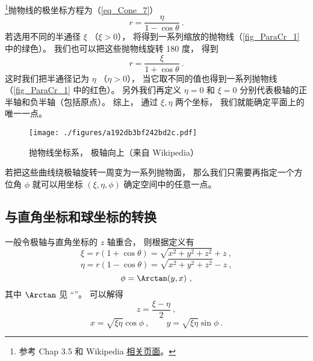 

\footnote{参考 \cite{Bransden} Chap 3.5 和 Wikipedia \href{https://en.wikipedia.org/wiki/Parabolic_coordinates}{相关页面}。}抛物线的极坐标方程为（\autoref{eq_Cone_7}）
\begin{equation}\label{eq_ParaCr_1}
r = \frac{\eta}{1 - \cos \theta }~.
\end{equation}
若选用不同的半通径 $\xi$ （$\xi > 0$）， 将得到一系列缩放的抛物线（\autoref{fig_ParaCr_1} 中的绿色）。 我们也可以把这些抛物线旋转 180 度， 得到
\begin{equation}
r = \frac{\xi}{1 + \cos \theta }~.
\end{equation}
这时我们把半通径记为 $\eta$ （$\eta > 0$）， 当它取不同的值也得到一系列抛物线（\autoref{fig_ParaCr_1} 中的红色）。 另外我们再定义 $\eta = 0$ 和 $\xi = 0$ 分别代表极轴的正半轴和负半轴（包括原点）。 综上， 通过 $\xi, \eta$ 两个坐标， 我们就能确定平面上的唯一一点。

\begin{figure}[ht]
\centering
\texttt{[image: ./figures/a192db3bf242bd2c.pdf]}
\caption{抛物线坐标系， 极轴向上（来自 Wikipedia）} \label{fig_ParaCr_1}
\end{figure}

若把这些曲线绕极轴旋转一周变为一系列抛物面， 那么我们只需要再指定一个方位角 $\phi$ 就可以用坐标 $(\xi, \eta, \phi)$ 确定空间中的任意一点。

\subsection{与直角坐标和球坐标的转换}
一般令极轴与直角坐标的 $z$ 轴重合， 则根据定义有
\begin{equation}
\xi = r(1 + \cos\theta) = \sqrt{x^2 + y^2 + z^2} + z~,
\end{equation}
\begin{equation}
\eta = r(1 - \cos\theta) = \sqrt{x^2 + y^2 + z^2} - z~,
\end{equation}
\begin{equation}
\phi = \Arctan(y, x)~,
\end{equation}
其中 $\Arctan$ 见 “”。 可以解得
\begin{equation}\label{eq_ParaCr_2}
z = \frac{\xi - \eta}{2}~,
\end{equation}
\begin{equation}\label{eq_ParaCr_3}
x = \sqrt{\xi\eta}\cos\phi ~,\qquad
y = \sqrt{\xi\eta}\sin\phi~.
\end{equation}

